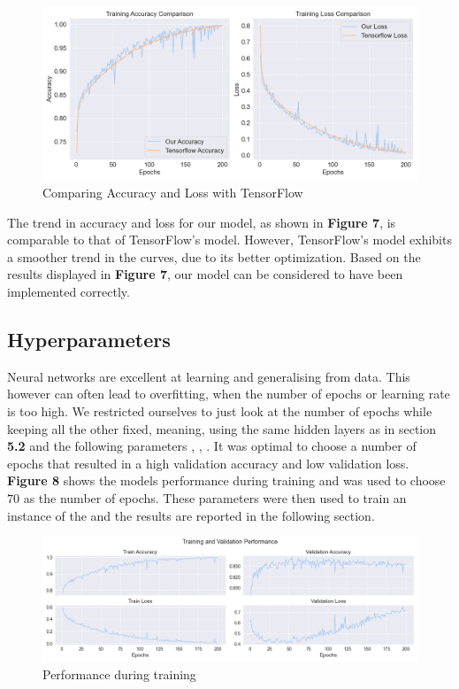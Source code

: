 \begin{figure}[H]
    \centering
    \includegraphics[scale=0.45]{figures_for_report/tensorflow_vs_our}
    \captionsetup{justification=centering,margin=2cm}
    \caption{Comparing Accuracy and Loss with TensorFlow}
\end{figure}

The trend in accuracy and loss for our model, as shown in \textbf{Figure 7}, is comparable to that of TensorFlow's model.
However, TensorFlow's model exhibits a smoother trend in the curves, due to its better optimization.
Based on the results displayed in \textbf{Figure 7}, our model can be considered to have been implemented correctly.

\subsection{Hyperparameters}
Neural networks are excellent at learning and generalising from data.
This however can often lead to overfitting, when the number of epochs or learning rate is too high.
We restricted ourselves to just look at the number of epochs while keeping all the other fixed, meaning, using the same hidden layers as in section \textbf{5.2} and the following parameters
, , .
It was optimal to choose a number of epochs that resulted in a high validation accuracy and low validation loss.
\textbf{Figure 8} shows the models performance during training and was used to choose $70$ as the number of epochs.
These parameters were then used to train an instance of the  and the results are reported in the following section.
\begin{figure}[H]
    \centering
    \includegraphics[scale=0.45]{figures_for_report/train_validation_nn_performance}
    \captionsetup{justification=centering,margin=2cm}
    \caption{Performance during training}
\end{figure}


